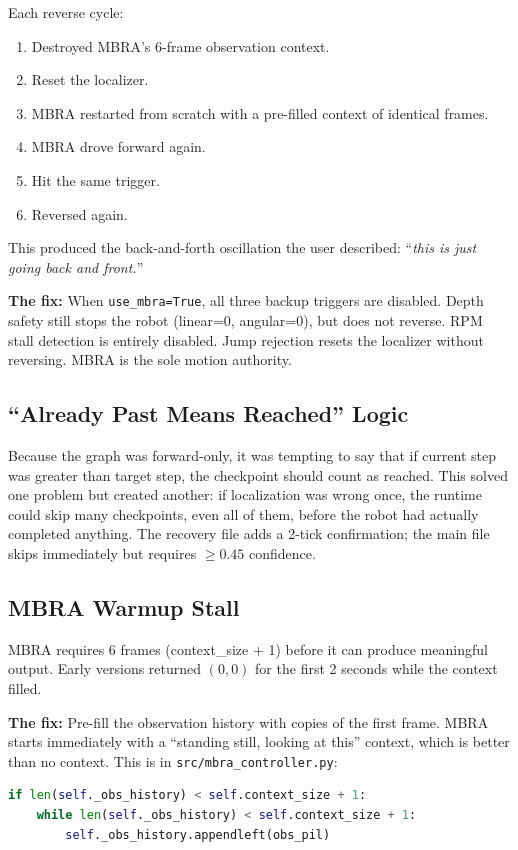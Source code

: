 \documentclass[11pt]{article}
\begin{document}
Each reverse cycle:
\begin{enumerate}
\item Destroyed MBRA's 6-frame observation context.
\item Reset the localizer.
\item MBRA restarted from scratch with a pre-filled context of identical frames.
\item MBRA drove forward again.
\item Hit the same trigger.
\item Reversed again.
\end{enumerate}

This produced the back-and-forth oscillation the user described: ``\emph{this is just going back and front.}''

\textbf{The fix:} When \texttt{use\_mbra=True}, all three backup triggers are disabled. Depth safety still stops the robot (linear=0, angular=0), but does not reverse. RPM stall detection is entirely disabled. Jump rejection resets the localizer without reversing. MBRA is the sole motion authority.

\subsection{``Already Past Means Reached'' Logic}

Because the graph was forward-only, it was tempting to say that if current step was greater than target step, the checkpoint should count as reached. This solved one problem but created another: if localization was wrong once, the runtime could skip many checkpoints, even all of them, before the robot had actually completed anything. The recovery file adds a 2-tick confirmation; the main file skips immediately but requires $\geq 0.45$ confidence.

\subsection{MBRA Warmup Stall}

MBRA requires 6 frames (context\_size + 1) before it can produce meaningful output. Early versions returned $(0, 0)$ for the first 2 seconds while the context filled.

\textbf{The fix:} Pre-fill the observation history with copies of the first frame. MBRA starts immediately with a ``standing still, looking at this'' context, which is better than no context. This is in \texttt{src/mbra\_controller.py}:
\begin{lstlisting}[language=Python]
if len(self._obs_history) < self.context_size + 1:
    while len(self._obs_history) < self.context_size + 1:
        self._obs_history.appendleft(obs_pil)
\end{lstlisting}
\end{document}
